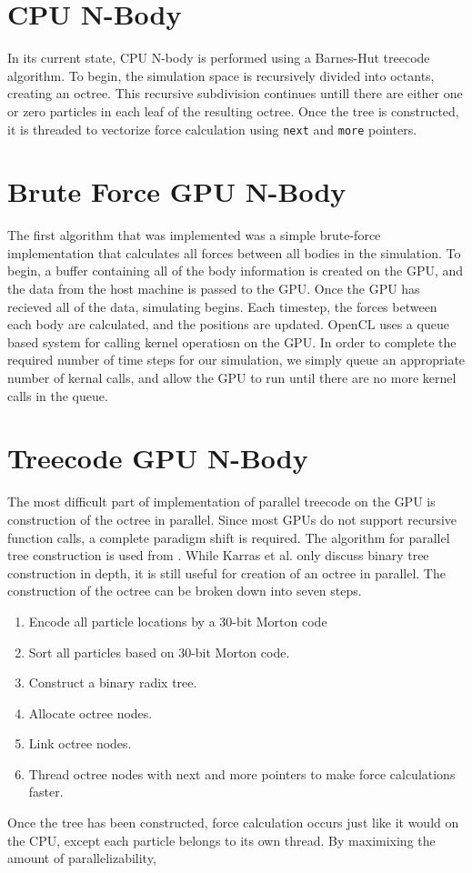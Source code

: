 \documentclass{thesis}
\begin{document}
\section{CPU N-Body}
In its current state, CPU N-body is performed using a Barnes-Hut treecode algorithm. To begin, the simulation space is recursively divided into octants, creating an octree. This recursive subdivision continues untill there are either one or zero particles in each leaf of the resulting octree. Once the tree is constructed, it is threaded to vectorize force calculation using \texttt{next} and \texttt{more} pointers. 

\section{Brute Force GPU N-Body}
The first algorithm that was implemented was a simple brute-force implementation that calculates all forces between all bodies in the simulation. To begin, a buffer containing all of the body information is created on the GPU, and the data from the host machine is passed to the GPU. Once the GPU has recieved all of the data, simulating begins. Each timestep, the forces between each body are calculated, and the positions are updated. OpenCL uses a queue based system for calling kernel operatiosn on the GPU. In order to complete the required number of time steps for our simulation, we simply queue an appropriate number of kernal calls, and allow the GPU to run until there are no more kernel calls in the queue.
\section{Treecode GPU N-Body}
The most difficult part of implementation of parallel treecode on the GPU is construction of the octree in parallel. Since most GPUs do not support recursive function calls, a complete paradigm shift is required. The algorithm for parallel tree construction is used from \cite{karras:2012}. While Karras et al. only discuss binary tree construction in depth, it is still useful for creation of an octree in parallel. The construction of the octree can be broken down into seven steps. 
\begin{enumerate}
    \item Encode all particle locations by a 30-bit Morton code
    \item Sort all particles based on 30-bit Morton code.
    \item Construct a binary radix tree.
    \item Allocate octree nodes.
    \item Link octree nodes.
    \item Thread octree nodes with next and more pointers to make force calculations faster.
\end{enumerate}
Once the tree has been constructed, force calculation occurs just like it would on the CPU, except each particle belongs to its own thread. By maximixing the amount of parallelizability, 
\end{document}
